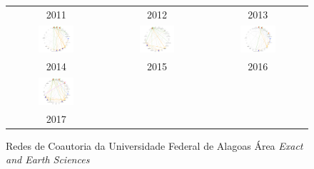 \begin{figure}[H]
\begin{tabular}{ccc}
		2011 & 2012 & 2013\\[6pt]
		\includegraphics[width=0.38\textwidth]{Imagens/rede-exact-AL-2014.pdf} &
		\includegraphics[width=0.38\textwidth]{Imagens/rede-exact-AL-2015.pdf} &
		\includegraphics[width=0.38\textwidth]{Imagens/rede-exact-AL-2016.pdf} \\
		2014 & 2015 & 2016\\[6pt]  \includegraphics[width=0.38\textwidth]{Imagens/rede-exact-AL-2017.pdf} & & \\
		2017 & & \\
	\end{tabular}
	\caption{Redes de Coautoria da Universidade Federal de Alagoas  Área \textit{Exact and Earth Sciences}}
\end{figure}